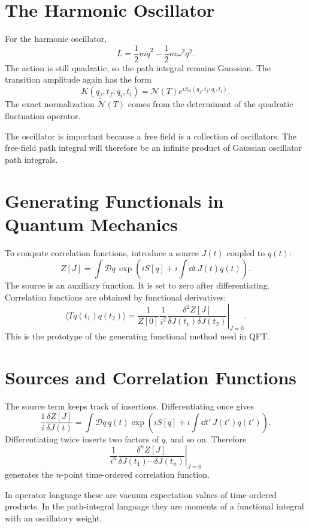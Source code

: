 \section{The Harmonic Oscillator}

For the harmonic oscillator,
\[
    L=\frac{1}{2}m\dot q^2-\frac{1}{2}m\omega^2q^2.
\]
The action is still quadratic, so the path integral remains Gaussian. The
transition amplitude again has the form
\[
    K(q_f,t_f;q_i,t_i)
    = \mathcal{N}(T)e^{iS_{\mathrm{cl}}(q_f,t_f;q_i,t_i)}.
\]
The exact normalization \(\mathcal{N}(T)\) comes from the determinant of the
quadratic fluctuation operator.

The oscillator is important because a free field is a collection of oscillators.
The free-field path integral will therefore be an infinite product of Gaussian
oscillator path integrals.

\section{Generating Functionals in Quantum Mechanics}

To compute correlation functions, introduce a source \(J(t)\) coupled to
\(q(t)\):
\[
    Z[J]
    = \int\mathcal{D}q\,
      \exp\left(iS[q]+i\int\dd t\,J(t)q(t)\right).
\]
The source is an auxiliary function. It is set to zero after differentiating.
Correlation functions are obtained by functional derivatives:
\[
    \langle T q(t_1)q(t_2)\rangle
    = \frac{1}{Z[0]}
      \left.\frac{1}{i^2}\frac{\delta^2 Z[J]}{\delta J(t_1)\delta J(t_2)}\right|_{J=0}.
\]
This is the prototype of the generating functional method used in QFT.

\section{Sources and Correlation Functions}

The source term keeps track of insertions. Differentiating once gives
\[
    \frac{1}{i}\frac{\delta Z[J]}{\delta J(t)}
    = \int\mathcal{D}q\,q(t)
      \exp\left(iS[q]+i\int\dd t'\,J(t')q(t')\right).
\]
Differentiating twice inserts two factors of \(q\), and so on. Therefore
\[
    \left.\frac{1}{i^n}\frac{\delta^n Z[J]}{\delta J(t_1)\cdots\delta J(t_n)}\right|_{J=0}
\]
generates the \(n\)-point time-ordered correlation function.

In operator language these are vacuum expectation values of time-ordered
products. In the path-integral language they are moments of a functional
integral with an oscillatory weight.


